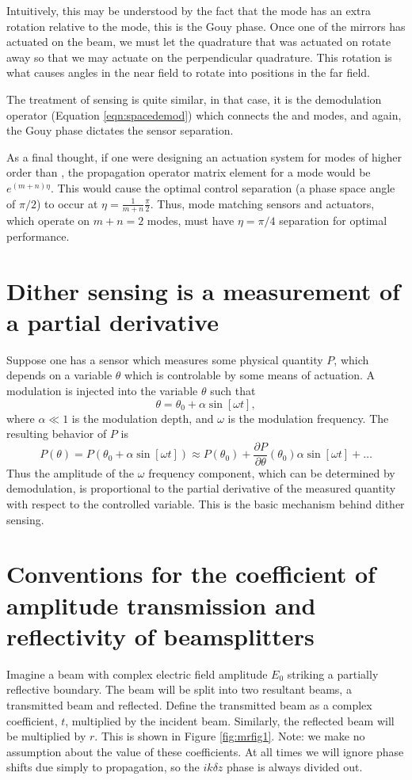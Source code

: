 Intuitively, this may be understood by the fact that the  mode has an extra rotation relative to the  mode, this is the Gouy phase. %
Once one of the mirrors has actuated on the beam, we must let the quadrature that was actuated on rotate away so that we may actuate on the perpendicular quadrature. %
This rotation is what causes angles in the near field to rotate into positions in the far field. %


The treatment of sensing is quite similar, in that case, it is the demodulation operator (Equation \ref{eqn:spacedemod}) which connects the  and  modes, and again, the Gouy phase dictates the sensor separation.

As a final thought, if one were designing an actuation system for modes of higher order than , the propagation operator matrix element for a  mode would be $e^{(m+n)\eta}$. %
This would cause the optimal control separation (a phase space angle of $\pi/2$) to occur at $\eta=\frac{1}{m+n}\frac{\pi}{2}$. %
Thus, mode matching sensors and actuators, which operate on $m+n=2$ modes, must have  $\eta=\pi/4$ separation for optimal performance.

\section{Dither sensing is a measurement of a partial derivative}
\label{sec:dithersens}
Suppose one has a sensor which measures some physical quantity $P$, which depends on a variable $\theta$ which is controlable by some means of actuation. %
A modulation is injected into the variable $\theta$ such that
\begin{equation}
\theta = \theta_0+\alpha \sin[\omega t],
\end{equation}
where $\alpha \ll 1$ is the modulation depth, and $\omega$ is the modulation frequency. %
The resulting behavior of $P$ is
\begin{equation}
P(\theta)=P(\theta_0+\alpha \sin[\omega t])\approx P(\theta_0)+\frac{\partial P}{\partial \theta}(\theta_0)\alpha \sin[\omega t] + \ldots
\end{equation}
Thus the amplitude of the $\omega$ frequency component, which can be determined by demodulation, is proportional to the partial derivative of the measured quantity with respect to the controlled variable. %
This is the basic mechanism behind dither sensing.
\section{Conventions for the coefficient of amplitude transmission and reflectivity of beamsplitters}
Imagine a beam with complex electric field amplitude $E_0$ striking a partially reflective boundary. %
The beam will be split into two resultant beams, a transmitted beam and reflected. %
Define the transmitted beam as a complex coefficient, $t$, multiplied by the incident beam. %
Similarly, the reflected beam will be multiplied by $r$. %
This is shown in Figure \ref{fig:mrfig1}. %
Note: we make no assumption about the value of these coefficients. %
At all times we will ignore phase shifts due simply to propagation, so the $ik\delta z$ phase is always divided out.

